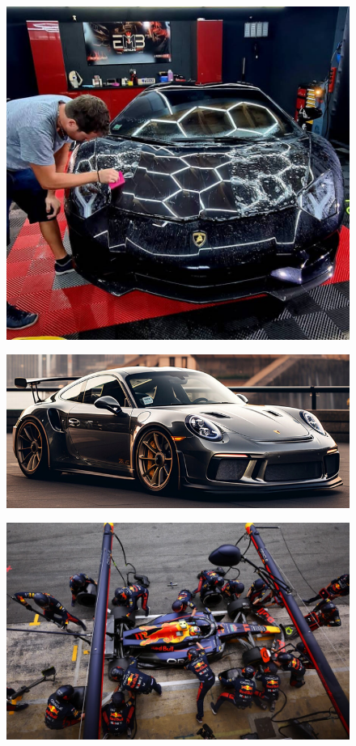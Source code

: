 \begin{multicols}{3} 
 \begin{figure}[H]
    \centering
    \includegraphics[width=0.8\linewidth]{5x2-inegalite-triangulaire/lambo.jpg}
  \end{figure}

  \begin{figure}[H]
    \centering
    \includegraphics[width=\linewidth]{5x2-inegalite-triangulaire/porsche.png}
  \end{figure} 

    \begin{figure}[H]
    \centering
    \includegraphics[width=\linewidth]{5x2-inegalite-triangulaire/f1.png}
  \end{figure} 
\end{multicols}

